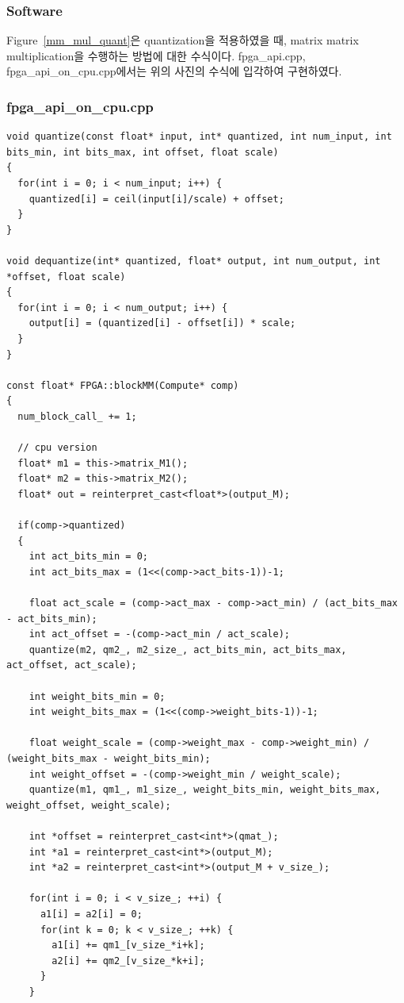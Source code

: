 \documentclass{article}
\begin{document}
\subsubsection{Software}
Figure~\ref{mm_mul_quant}은 quantization을 적용하였을 때, matrix matrix multiplication을 수행하는 방법에 대한 수식이다. fpga\_api.cpp, fpga\_api\_on\_cpu.cpp에서는 위의 사진의 수식에 입각하여 구현하였다.

\subsubsection*{fpga\_api\_on\_cpu.cpp}
\begin{lstlisting}[style={c-style}]
void quantize(const float* input, int* quantized, int num_input, int bits_min, int bits_max, int offset, float scale)
{
  for(int i = 0; i < num_input; i++) {
    quantized[i] = ceil(input[i]/scale) + offset;
  }
}

void dequantize(int* quantized, float* output, int num_output, int *offset, float scale)
{
  for(int i = 0; i < num_output; i++) {
    output[i] = (quantized[i] - offset[i]) * scale;
  }
}

const float* FPGA::blockMM(Compute* comp)
{
  num_block_call_ += 1;

  // cpu version
  float* m1 = this->matrix_M1();
  float* m2 = this->matrix_M2();
  float* out = reinterpret_cast<float*>(output_M);  

  if(comp->quantized)
  {
    int act_bits_min = 0;
    int act_bits_max = (1<<(comp->act_bits-1))-1;

    float act_scale = (comp->act_max - comp->act_min) / (act_bits_max - act_bits_min);
    int act_offset = -(comp->act_min / act_scale);
    quantize(m2, qm2_, m2_size_, act_bits_min, act_bits_max, act_offset, act_scale);

    int weight_bits_min = 0;
    int weight_bits_max = (1<<(comp->weight_bits-1))-1;

    float weight_scale = (comp->weight_max - comp->weight_min) / (weight_bits_max - weight_bits_min);
    int weight_offset = -(comp->weight_min / weight_scale);
    quantize(m1, qm1_, m1_size_, weight_bits_min, weight_bits_max, weight_offset, weight_scale);

    int *offset = reinterpret_cast<int*>(qmat_);
    int *a1 = reinterpret_cast<int*>(output_M);
    int *a2 = reinterpret_cast<int*>(output_M + v_size_);

    for(int i = 0; i < v_size_; ++i) {
      a1[i] = a2[i] = 0;
      for(int k = 0; k < v_size_; ++k) {
        a1[i] += qm1_[v_size_*i+k];
        a2[i] += qm2_[v_size_*k+i];
      }
    }


\end{lstlisting}
\end{document}
